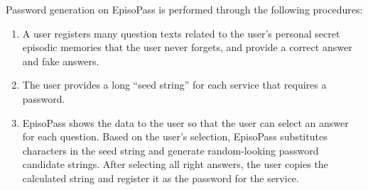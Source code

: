 \documentclass{article}
\begin{document}
% 

Password generation on EpisoPass is performed through the following procedures:

\begin{enumerate}
\item A user registers many question texts related to the user's personal
secret episodic memories that the user never forgets,
and provide a correct answer and fake answers.

\item The user provides a long ``seed string'' for each service that requires
a password.

\item EpisoPass shows the data to the user so that
the user can select an answer for each question.
Based on the user's selection,
EpisoPass substitutes characters in the seed string and generate
random-looking password candidate strings.
After selecting all right answers,
the user copies the calculated string
and register it as the password for the service.
\end{enumerate}
\end{document}
